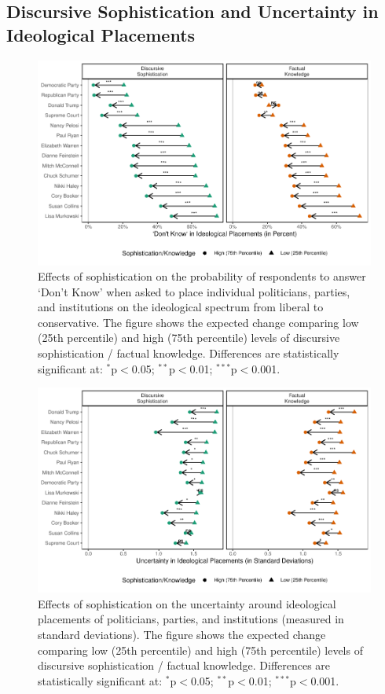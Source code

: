 \clearpage
\subsection{Discursive Sophistication and Uncertainty in Ideological Placements}\label{app:placement}

\begin{figure}[h]\centering
	\includegraphics{../fig/placements_dk.pdf}
	\caption{Effects of sophistication on the probability of respondents to answer `Don't Know' when asked to place individual politicians, parties, and institutions on the ideological spectrum from liberal to conservative. The figure shows the expected change comparing low (25th percentile) and high (75th percentile) levels of discursive sophistication / factual knowledge. Differences are statistically significant at: $^{*}$p$<$0.05; $^{**}$p$<$0.01; $^{***}$p$<$0.001.}\label{fig:placements_dk}
\end{figure}

\begin{figure}[h]\centering
	\includegraphics{../fig/placements.pdf}
	\caption{Effects of sophistication on the uncertainty around ideological placements of  politicians, parties, and institutions (measured in standard deviations). The figure shows the expected change comparing low (25th percentile) and high (75th percentile) levels of discursive sophistication / factual knowledge. Differences are statistically significant at: $^{*}$p$<$0.05; $^{**}$p$<$0.01; $^{***}$p$<$0.001.}\label{fig:placements}
\end{figure}

